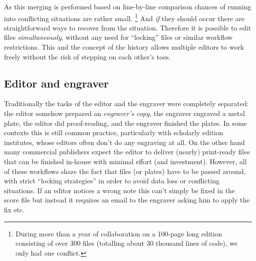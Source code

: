 \documentclass[11pt,a4paper]{article}
\begin{document}
As this merging is performed based on line-by-line comparison chances of running into
conflicting situations are rather small.%
\footnote{During more than a year of collaboration on a 100-page long edition
consisting of over 300 files (totalling about 30 thousand lines of code), we only had one conflict.}
And \emph{if} they should occur there are
straightforward ways to recover from the situation. Therefore it is possible to edit files
\emph{simultaneously}, without any need for “locking” files or similar workflow
restrictions. This and the concept of the history allows multiple editors to work freely
without the risk of stepping on each other's toes.

\subsection{Editor and engraver}
Traditionally the tasks of the editor and the engraver were completely separated: the
editor somehow prepared an \emph{engraver's copy}, the engraver engraved a metal plate,
the editor did proof-reading, and the engraver finished the plates. In some contexts
this is still common practice, particularly with scholarly edition institutes, whose
editors often don't do any engraving at all. On the other hand many commercial
publishers expect the editor to deliver (nearly) print-ready files that can be
finished in-house with minimal effort (and investment). However, all of these workflows
share the fact that files (or plates) have to be passed around, with strict
“locking strategies” in order to avoid data loss or conflicting situations. If an editor
notices a wrong note this can't simply be fixed in the score file but instead it requires
an email to the engraver asking him to apply the fix etc.
\end{document}
